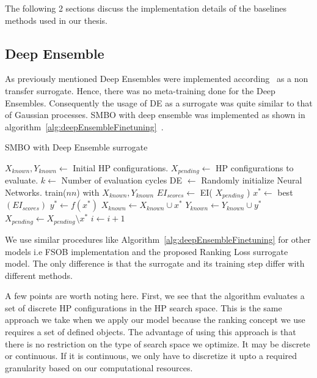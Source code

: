 \documentclass[12pt, twoside, ngerman]{report}
\begin{document}
The following 2 sections discuss the implementation details of the baselines methods used in our thesis.

\subsection{Deep Ensemble}

As previously mentioned Deep Ensembles were implemented according~\cite{DeepEnsemblePaper} as a non transfer surrogate.
Hence,  there was no meta-training done for the Deep Ensembles.
Consequently the usage of DE as a surrogate was quite similar to that of Gaussian processes.
SMBO with deep ensemble was implemented as shown in algorithm~\ref{alg:deepEnsembleFinetuning}~\cite{pineda2021hpob}.

\begin{algorithm}[H]
\caption{SMBO with Deep Ensemble surrogate}
\label{alg:deepEnsembleFinetuning}
\begin{algorithmic}
    \State $X_{known},  Y_{known} \gets$ Initial HP configurations.
    \State $X_{pending} \gets$ HP configurations to evaluate.
    \State $k \gets$ Number of evaluation cycles
        \State DE $\gets$ Randomly initialize Neural Networks. 
          
            \State train($nn$) with $X_{known},  Y_{known}$
        \EndFor
        \State $EI_{scores} \gets$ EI( $X_{pending}$ ) 
        \State $x^* \gets $ best $(EI_{scores})$
        \State $y^* \gets f(x^*)$ 
        \State $X_{known} \gets X_{known} \cup x^*$
        \State $Y_{known} \gets Y_{known} \cup y^*$
        \State $X_{pending} \gets X_{pending} \setminus x^*$ 
        \State $i \gets i + 1$
    \EndFor
    
\end{algorithmic}
\end{algorithm}

We use similar procedures like Algorithm~\ref{alg:deepEnsembleFinetuning} for other models i.e FSOB implementation and the proposed Ranking Loss surrogate model.
The only difference is that the surrogate and its training step differ with different methods.

A few points are worth noting here.
First,  we see that the algorithm evaluates a set of discrete HP configurations in the HP search space.
This is the same approach we take when we apply our model because the ranking concept we use requires a set of defined objects.
The advantage of using this approach is that there is no restriction on the type of search space we optimize.
It may be discrete or continuous.
If it is continuous,  we only have to discretize it upto a required granularity based on our computational resources.
\end{document}
